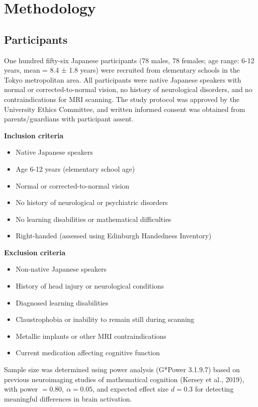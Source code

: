 \section{Methodology}
\subsection{Participants}
One hundred fifty-six Japanese participants (78 males, 78 females; age range: 6-12 years, mean = 8.4 ± 1.8 years) were recruited from elementary schools in the Tokyo metropolitan area. All participants were native Japanese speakers with normal or corrected-to-normal vision, no history of neurological disorders, and no contraindications for MRI scanning. The study protocol was approved by the University Ethics Committee, and written informed consent was obtained from parents/guardians with participant assent.

\vspace{0.5\baselineskip}
\noindent
\textbf{Inclusion criteria}
\indent
\begin{itemize}
\item Native Japanese speakers 
\item Age 6-12 years (elementary school age)
\item Normal or corrected-to-normal vision 
\item No history of neurological or psychiatric disorders 
\item No learning disabilities or mathematical difficulties 
\item Right-handed (assessed using Edinburgh Handedness Inventory)
\end{itemize}
\noindent
\textbf{Exclusion criteria}
\indent
\begin{itemize}
\item Non-native Japanese speakers 
\item History of head injury or neurological conditions 
\item Diagnosed learning disabilities 
\item Claustrophobia or inability to remain still during scanning 
\item Metallic implants or other MRI contraindications 
\item Current medication affecting cognitive function 
\end{itemize}

Sample size was determined using power analysis (G*Power 3.1.9.7) based on previous neuroimaging studies of mathematical cognition (Kersey et al., 2019), with power $= 0.80,~\alpha = 0.05$, and expected effect size $d = 0.3$ for detecting meaningful differences in brain activation.



